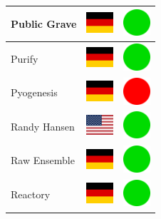 \documentclass[12pt, a4paper, twoside]{report}
\begin{document}
\begin{center}
\begin{longtable}{|p{5cm}|p{2cm}|p{2cm}|}
Public Grave & \includegraphics[width=1cm]{4x3/de} & \includegraphics[width=1cm]{likes/y} \\ \hline
Purify & \includegraphics[width=1cm]{4x3/de} & \includegraphics[width=1cm]{likes/y} \\ \hline
Pyogenesis & \includegraphics[width=1cm]{4x3/de} & \includegraphics[width=1cm]{likes/n} \\ \hline
Randy Hansen & \includegraphics[width=1cm]{4x3/us} & \includegraphics[width=1cm]{likes/y} \\ \hline
Raw Ensemble & \includegraphics[width=1cm]{4x3/de} & \includegraphics[width=1cm]{likes/y} \\ \hline
Reactory & \includegraphics[width=1cm]{4x3/de} & \includegraphics[width=1cm]{likes/y} \\ \hline

\end{longtable}
\end{center}
\end{document}
